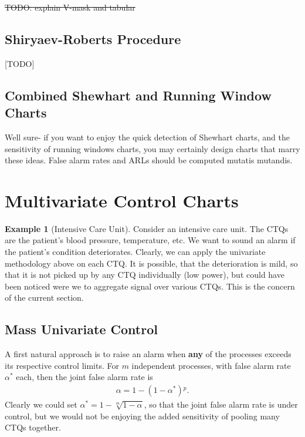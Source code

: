 \documentclass[12pt,a4paper]{report}
\theoremstyle{plain}
\theoremstyle{definition}
\newtheorem{example}{Example}
\providecommand{\DIFaddtex}[1]{{\protect\color{blue}\uwave{#1}}} %
\providecommand{\DIFdeltex}[1]{{\protect\color{red}\sout{#1}}}                      %
\providecommand{\DIFaddbegin}{} %
\providecommand{\DIFaddend}{} %
\providecommand{\DIFdelbegin}{} %
\providecommand{\DIFdelend}{} %
\providecommand{\DIFadd}[1]{\texorpdfstring{\DIFaddtex{#1}}{#1}} %
\providecommand{\DIFdel}[1]{\texorpdfstring{\DIFdeltex{#1}}{}} %
\begin{document}
\DIFdelbegin %
\DIFdel{TODO: explain V-mask and tabular}%

\DIFdelend \subsection{Shiryaev-Roberts Procedure}
[TODO]





\subsection{Combined Shewhart and Running Window Charts}
Well sure- if you want to enjoy the quick detection of Shewhart charts, and the sensitivity of running windows charts, you may certainly design charts that marry these ideas.
False alarm rates and ARLs should be computed mutatis mutandis.







\section[Multivariate]{Multivariate Control Charts}
\label{sec:multivariate}

\begin{example}[Intensive Care Unit]
\label{eg:intensive}
Consider an intensive care unit. 
The CTQs are the patient's blood pressure, temperature, etc.
We want to sound an alarm if the patient's condition deteriorates. 
Clearly, we can apply the univariate methodology above on each CTQ.
It is possible, that the deterioration is mild, so that it is not picked up by any CTQ individually (low power), but could have been noticed were we to aggregate signal over various CTQs. 
This is the concern of the current section. 
\end{example}


\subsection{Mass Univariate Control}
\label{sec:mass_univariate}

A first natural approach is to raise an alarm when \textbf{any} of the processes exceeds its respective control limits.
For \DIFdelbegin \DIFdel{$m$ }\DIFdelend \DIFaddbegin \DIFadd{$p$ }\DIFaddend independent processes, with false alarm rate $\alpha^*$ each, then the joint false alarm rate is 
\begin{align}
	\alpha  = 1-(1-\alpha^*){^p}.
\end{align}
Clearly we could set \DIFdelbegin \DIFdel{$\alpha^*=1-\sqrt[m]{1-\alpha}$}\DIFdelend \DIFaddbegin \DIFadd{$\alpha^*=1-\sqrt[p]{1-\alpha}$}\DIFaddend , so that the joint false alarm rate is under control, but we would not be enjoying the added sensitivity of pooling many CTQs together. 
\end{document}
